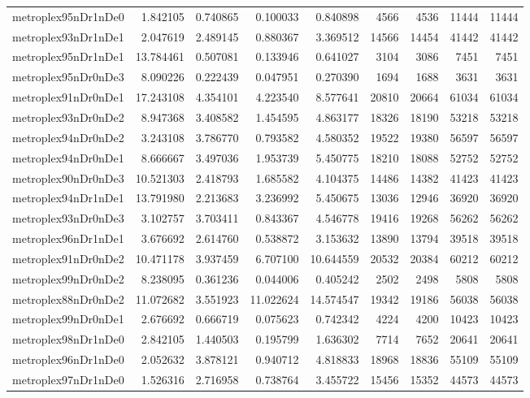 \begin{longtable}{|l|r|r|r|r|r|r|r|r|}
metroplex95nDr1nDe0 & 1.842105 & 0.740865 & 0.100033 & 0.840898 & 4566 & 4536 & 11444 & 11444 \\
metroplex93nDr1nDe1 & 2.047619 & 2.489145 & 0.880367 & 3.369512 & 14566 & 14454 & 41442 & 41442 \\
metroplex95nDr1nDe1 & 13.784461 & 0.507081 & 0.133946 & 0.641027 & 3104 & 3086 & 7451 & 7451 \\
metroplex95nDr0nDe3 & 8.090226 & 0.222439 & 0.047951 & 0.270390 & 1694 & 1688 & 3631 & 3631 \\
metroplex91nDr0nDe1 & 17.243108 & 4.354101 & 4.223540 & 8.577641 & 20810 & 20664 & 61034 & 61034 \\
metroplex93nDr0nDe2 & 8.947368 & 3.408582 & 1.454595 & 4.863177 & 18326 & 18190 & 53218 & 53218 \\
metroplex94nDr0nDe2 & 3.243108 & 3.786770 & 0.793582 & 4.580352 & 19522 & 19380 & 56597 & 56597 \\
metroplex94nDr0nDe1 & 8.666667 & 3.497036 & 1.953739 & 5.450775 & 18210 & 18088 & 52752 & 52752 \\
metroplex90nDr0nDe3 & 10.521303 & 2.418793 & 1.685582 & 4.104375 & 14486 & 14382 & 41423 & 41423 \\
metroplex94nDr1nDe1 & 13.791980 & 2.213683 & 3.236992 & 5.450675 & 13036 & 12946 & 36920 & 36920 \\
metroplex93nDr0nDe3 & 3.102757 & 3.703411 & 0.843367 & 4.546778 & 19416 & 19268 & 56262 & 56262 \\
metroplex96nDr1nDe1 & 3.676692 & 2.614760 & 0.538872 & 3.153632 & 13890 & 13794 & 39518 & 39518 \\
metroplex91nDr0nDe2 & 10.471178 & 3.937459 & 6.707100 & 10.644559 & 20532 & 20384 & 60212 & 60212 \\
metroplex99nDr0nDe2 & 8.238095 & 0.361236 & 0.044006 & 0.405242 & 2502 & 2498 & 5808 & 5808 \\
metroplex88nDr0nDe2 & 11.072682 & 3.551923 & 11.022624 & 14.574547 & 19342 & 19186 & 56038 & 56038 \\
metroplex99nDr0nDe1 & 2.676692 & 0.666719 & 0.075623 & 0.742342 & 4224 & 4200 & 10423 & 10423 \\
metroplex98nDr1nDe0 & 2.842105 & 1.440503 & 0.195799 & 1.636302 & 7714 & 7652 & 20641 & 20641 \\
metroplex96nDr1nDe0 & 2.052632 & 3.878121 & 0.940712 & 4.818833 & 18968 & 18836 & 55109 & 55109 \\
metroplex97nDr1nDe0 & 1.526316 & 2.716958 & 0.738764 & 3.455722 & 15456 & 15352 & 44573 & 44573 \\

\end{longtable}

